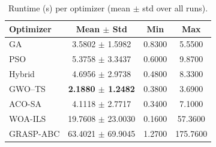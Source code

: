 \begin{table}[t]
  \centering
  \caption{Runtime (s) per optimizer (mean $\pm$ std over all runs).}
  \label{tab:runtime_sec_desc}
  \begin{tabular}{@{}l c c c@{}}
    \toprule
    \textbf{Optimizer} & \textbf{Mean $\pm$ Std} & \textbf{Min} & \textbf{Max} \\
    \midrule
    GA & 3.5802 $\pm$ 1.5982 & 0.8300 & 5.5500 \\
    PSO & 5.3758 $\pm$ 3.3437 & 0.6000 & 9.8700 \\
    Hybrid & 4.6956 $\pm$ 2.9738 & 0.4800 & 8.3300 \\
    GWO--TS & \textbf{2.1880 $\pm$ 1.2482} & 0.3800 & 3.6900 \\
    ACO-SA & 4.1118 $\pm$ 2.7717 & 0.3400 & 7.1000 \\
    WOA-ILS & 19.7608 $\pm$ 23.0030 & 0.1600 & 57.3600 \\
    GRASP-ABC & 63.4021 $\pm$ 69.9045 & 1.2700 & 175.7600 \\
    \bottomrule
  \end{tabular}
\end{table}